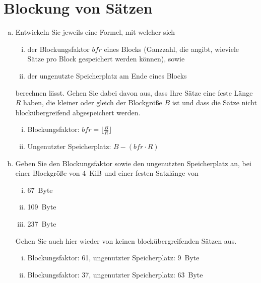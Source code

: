 \beamertxt{\pagebreak}
\section{Blockung von Sätzen}
\begin{enumerate}[a)]
	\item Entwickeln Sie jeweils eine Formel, mit welcher sich
	\begin{enumerate}[i)]
		\item der Blockungsfaktor $\mathit{bfr}$ eines Blocks (Ganzzahl, die angibt, wieviele Sätze pro Block gespeichert werden können), sowie
		\item der ungenutzte Speicherplatz am Ende eines Blocks
	\end{enumerate}
	berechnen lässt. Gehen Sie dabei davon aus, dass Ihre Sätze eine feste Länge $R$ haben, die kleiner oder gleich der Blockgröße $B$ ist und dass die Sätze nicht blockübergreifend abgespeichert werden.

	\begin{solution}
	\begin{enumerate}[i)]
		\item Blockungsfaktor: $\mathit{bfr} = \lfloor\frac{B}{R}\rfloor$
		\item Ungenutzter Speicherplatz: $B - (\mathit{bfr} \cdot R)$
	\end{enumerate}
	\end{solution}


	\item Geben Sie den Blockungsfaktor sowie den ungenutzten Speicherplatz an, bei einer Blockgröße von 4~KiB  und einer festen Satzlänge von
	\begin{enumerate}[i)]
		\item 67~Byte
		\item 109~Byte
		\item 237~Byte \selbst
	\end{enumerate}
	Gehen Sie auch hier wieder von keinen blockübergreifenden Sätzen aus.

	\begin{solution}
	\begin{enumerate}[i)]
		\item Blockungsfaktor: 61, ungenutzter Speicherplatz: 9~Byte
		\item Blockungsfaktor: 37, ungenutzter Speicherplatz: 63~Byte
	\end{enumerate}
	\end{solution}



\end{enumerate}
